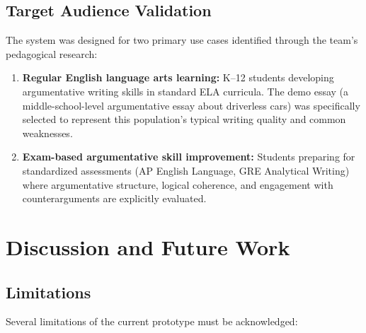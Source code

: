 \documentclass[11pt,a4paper]{article}
\begin{document}
\subsection{Target Audience Validation}

The system was designed for two primary use cases identified through the team's pedagogical research:

\begin{enumerate}[leftmargin=*]
    \item \textbf{Regular English language arts learning:} K--12 students developing argumentative writing skills in standard ELA curricula. The demo essay (a middle-school-level argumentative essay about driverless cars) was specifically selected to represent this population's typical writing quality and common weaknesses.

    \item \textbf{Exam-based argumentative skill improvement:} Students preparing for standardized assessments (AP English Language, GRE Analytical Writing) where argumentative structure, logical coherence, and engagement with counterarguments are explicitly evaluated.
\end{enumerate}

\section{Discussion and Future Work}
\label{sec:discussion}

\subsection{Limitations}

Several limitations of the current prototype must be acknowledged:
\end{document}
